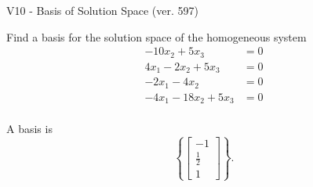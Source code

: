 \begin{exercise}
  \begin{exerciseTitle}V10 - Basis of Solution Space (ver. 597)\end{exerciseTitle}
  \begin{exerciseStatement}
    Find a basis for the solution space of the homogeneous system 
\begin{align*}
 -10 x_ 2 + 5 x_ 3 &= 0  \\ 
  4 x_ 1 -2 x_ 2 + 5 x_ 3 &= 0  \\ 
  -2 x_ 1 -4 x_ 2 &= 0  \\ 
  -4 x_ 1 -18 x_ 2 + 5 x_ 3 &= 0  \\ 
 \end{align*}


 
  \end{exerciseStatement}

  \begin{exerciseAnswer}
   A basis is   
\[\left\{\left[\begin{array}{c}
-1 \\
\frac{1}{2} \\
1
\end{array}\right]\right\}.\]

  


  \end{exerciseAnswer}
\end{exercise}